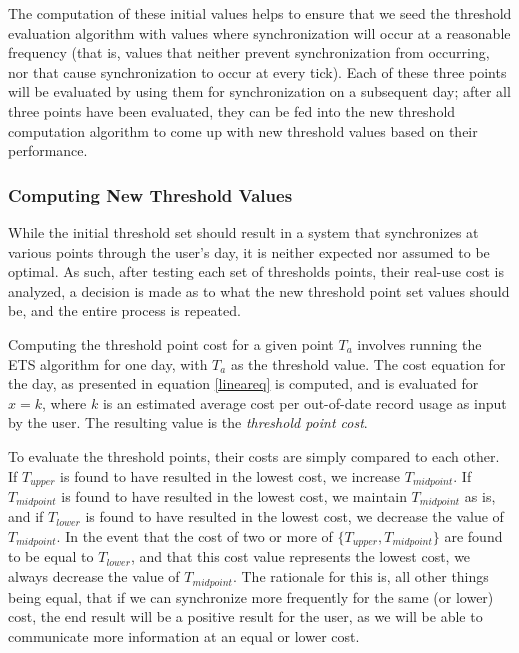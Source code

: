 The computation of these initial values helps to ensure that we seed the threshold evaluation algorithm with values where synchronization will occur at a reasonable frequency (that is, values that neither prevent synchronization from occurring, nor that cause synchronization to occur at every tick).  Each of these three points will be evaluated by using them for synchronization on a subsequent day; after all three points have been evaluated, they can be fed into the new threshold computation algorithm to come up with new threshold values based on their performance.

\subsubsection{Computing New Threshold Values}\label{threshold_computation}

While the initial threshold set should result in a system that synchronizes at various points through the user's day, it is neither expected nor assumed to be optimal.  As such, after testing each set of thresholds points, their real-use cost is analyzed, a decision is made as to what the new threshold point set values should be, and the entire process is repeated.

Computing the threshold point cost for a given point $T_a$ involves running the ETS algorithm for one day, with $T_a$ as the threshold value.  The cost equation for the day, as presented in equation \ref{lineareq} is computed, and is evaluated for $x = k$, where $k$ is an estimated average cost per out-of-date record usage as input by the user.  The resulting value is the \emph{threshold point cost}.

To evaluate the threshold points, their costs are simply compared to each other.  If $T_{upper}$ is found to have resulted in the lowest cost, we increase $T_{midpoint}$.  If $T_{midpoint}$ is found to have resulted in the lowest cost, we maintain $T_{midpoint}$ as is, and if $T_{lower}$ is found to have resulted in the lowest cost, we decrease the value of $T_{midpoint}$.  In the event that the cost of two or more of $\{T_{upper}, T_{midpoint}\}$ are found to be equal to $T_{lower}$, and that this cost value represents the lowest cost, we always decrease the value of $T_{midpoint}$.  The rationale for this is, all other things being equal, that if we can synchronize more frequently for the same (or lower) cost, the end result will be a positive result for the user, as we will be able to communicate more information at an equal or lower cost.

